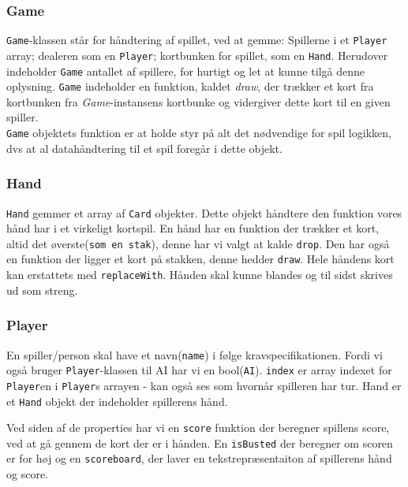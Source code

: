 \documentclass[a4paper]{article}
\begin{document}
      \subsubsection*{Game}
      \texttt{Game}-klassen står for håndtering af spillet, ved at gemme: Spillerne i et \texttt{Player} array; dealeren som en \texttt{Player}; kortbunken for spillet, som en \texttt{Hand}.
      Herudover indeholder \texttt{Game} antallet af spillere, for hurtigt og let at kunne tilgå denne oplysning.
      \texttt{Game} indeholder en funktion, kaldet \textit{draw}, der trækker et kort fra kortbunken fra \textit{Game}-instansens kortbunke og vidergiver dette kort til en given spiller. \\

      \texttt{Game} objektets funktion er at holde styr på alt det nødvendige for spil logikken,
      dvs at al datahåndtering til et spil foregår i dette objekt.

      \subsubsection*{Hand}
      \texttt{Hand} gemmer et array af \texttt{Card} objekter. Dette objekt håndtere den funktion vores hånd har i et virkeligt kortspil.
      En hånd har en funktion der trækker et kort, altid det øverste(\texttt{som en stak}), denne har vi valgt at kalde \lstinline$drop$.
      Den har også en funktion der ligger et kort på stakken, denne hedder \lstinline$draw$.
      Hele håndens kort kan erstattets med \lstinline$replaceWith$. Hånden skal kunne blandes og til sidst skrives ud som streng.

      \subsubsection*{Player}
      En spiller/person skal have et navn(\lstinline$name$) i følge kravspecifikationen.
      Fordi vi også bruger \texttt{Player}-klassen til AI har vi en bool(\lstinline$AI$).
      \lstinline$index$ er array indexet for \texttt{Player}en i \texttt{Player}s arrayen - kan også ses som hvornår spilleren har tur.
      Hand er et \texttt{Hand} objekt der indeholder spillerens hånd.

      Ved siden af de properties har vi en \lstinline$score$ funktion der beregner spillens score,
      ved at gå gennem de kort der er i hånden.
      En \lstinline$isBusted$ der beregner om scoren er for høj og en \lstinline$scoreboard$,
      der laver en tekstrepræsentaiton af spillerens hånd og score.
\end{document}
